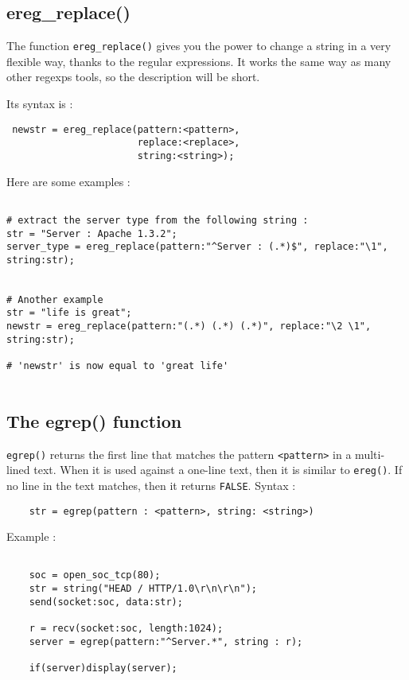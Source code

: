 \documentclass{article}
\begin{document}
\subsection{ereg\_replace()}

The function \verb+ereg_replace()+ gives you the power to change a string
in a very flexible way, thanks to the regular expressions. It works
the same way as many other regexps tools, so the description will
be short.

Its syntax is :
\begin{verbatim}
 newstr = ereg_replace(pattern:<pattern>, 
                       replace:<replace>,
                       string:<string>);
 \end{verbatim}

 Here are some examples :

\begin{verbatim}

# extract the server type from the following string : 
str = "Server : Apache 1.3.2";
server_type = ereg_replace(pattern:"^Server : (.*)$", replace:"\1", string:str);


# Another example
str = "life is great";
newstr = ereg_replace(pattern:"(.*) (.*) (.*)", replace:"\2 \1", string:str);

# 'newstr' is now equal to 'great life'


\end{verbatim}




 

\subsection{The egrep() function}

\verb+egrep()+ returns the first line that matches the pattern
\verb+<pattern>+ in a multi-lined text. When it is used against
a one-line text, then it is similar to \verb+ereg()+.
If no line in the text matches, then it returns \verb+FALSE+.
Syntax :
\begin{verbatim}
	str = egrep(pattern : <pattern>, string: <string>)
\end{verbatim}

Example :
\begin{verbatim}

	soc = open_soc_tcp(80);
	str = string("HEAD / HTTP/1.0\r\n\r\n");
	send(socket:soc, data:str);
	
	r = recv(socket:soc, length:1024);
	server = egrep(pattern:"^Server.*", string : r);
	
	if(server)display(server);
	
\end{verbatim}
\end{document}
